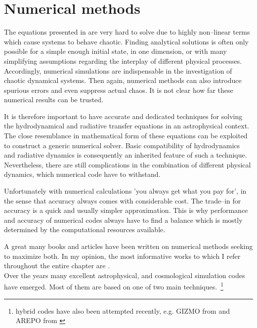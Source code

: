 \chapter{Numerical methods} %
\label{Chapter3} %

The equations presented in  are very hard to solve due to highly non--linear terms which cause systems to behave chaotic.
Finding analytical solutions is often only possible for a simple enough initial state, in one dimension, or with many simplifying assumptions regarding the interplay of different physical processes.
Accordingly, numerical simulations are indispensable in the investigation of chaotic dynamical systems.
Then again, numerical methods can also introduce spurious errors and even suppress actual chaos.
It is not clear how far these numerical results can be trusted.

It is therefore important to have accurate and dedicated techniques for solving the hydrodynamical and radiative transfer equations in an astrophysical context.
The close resemblance in mathematical form of these equations can be exploited to construct a generic numerical solver.
Basic compatibility of hydrodynamics and radiative dynamics is consequently an inherited feature of such a technique.
Nevertheless, there are still complications in the combination of different physical dynamics, which numerical code have to withstand.

Unfortunately with numerical calculations 'you always get what you pay for', in the sense that accuracy always comes with considerable cost.
The trade--in for accuracy is a quick and usually simpler approximation.
This is why performance and accuracy of numerical codes always have to find a balance which is mostly determined by the computational resources available.

A great many books and articles have been written on numerical methods seeking to maximize both.
In my opinion, the most informative works to which I refer throughout the entire chapter are \citet{Toro, LeVeque, Romain_numerical}.
\\[6pt]
%
Over the years many excellent astrophysical, and cosmological simulation codes have emerged.
Most of them are based on one of two main techniques.~\footnote{hybrid codes have also been attempted recently, e.g. GIZMO from \citet{GIZMO} and AREPO from \citet{AREPO}}

